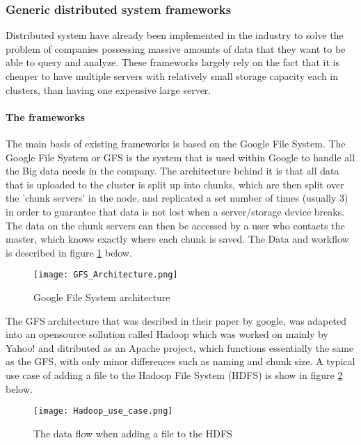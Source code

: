 \subsubsection{Generic distributed system frameworks}
Distributed system have already been implemented in the industry to solve the
problem of companies possessing massive amounts of data that they want to be able
to query and analyze. These frameworks largely rely on the fact that it is cheaper
to have multiple servers with relatively small storage capacity each in clusters,
than having one expensive large server.

\paragraph{The frameworks}
The main basis of existing frameworks is based on the Google File System\cite{Ghem03}. The
Google File System or GFS is the system that is used within Google to handle all
the Big data needs in the company. The architecture behind it is that all data that
is uploaded to the cluster is split up into chunks, which are then split over the
'chunk servers' in the node, and replicated a set number of times (usually 3) in
order to guarantee that data is not lost when a server/storage device breaks. The
data on the chunk servers can then be accessed by a user who contacts the master,
which knows exactly where each chunk is saved.\cite{Ghem03} The Data and workflow is described
in figure \ref{GFS_Architecture} below.

\begin{figure}
  \texttt{[image: GFS\_Architecture.png]}
  \caption{Google File System architecture\cite{Ghem03}}
  \label{GFS_Architecture}
\end{figure}

The GFS architecture that was desribed in their paper by google, was adapeted into
an opensource sollution called Hadoop \cite{Shv10} which was worked on mainly by Yahoo! and
ditributed as an Apache project, which functions essentially the same as the GFS,
with only minor differences such as naming and chunk size. A typical use case of
adding a file to the Hadoop File System (HDFS) is show in figure \ref{Hadoop_usecase}
below.

\begin{figure}
  \texttt{[image: Hadoop\_use\_case.png]}
  \caption{The data flow when adding a file to the HDFS\cite{Shv10}}
  \label{Hadoop_usecase}
\end{figure}

